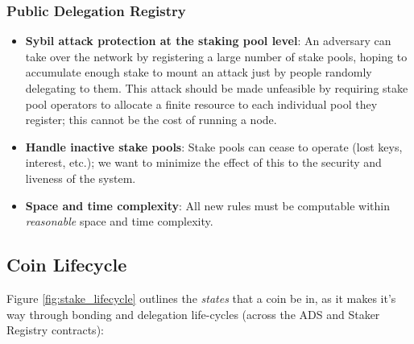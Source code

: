 \subsubsection{Public Delegation Registry}
\begin{itemize}
    \item \textbf{Sybil attack protection at the staking pool level}: An adversary can take over the network by registering a large number of stake pools, hoping to accumulate enough stake to mount an attack just by people randomly delegating to them. This attack should be made unfeasible by requiring stake pool operators to allocate a finite resource to each individual pool they register; this cannot be the cost of running a node.
    \item \textbf{Handle inactive stake pools}: Stake pools can cease to operate (lost keys, interest, etc.); we want to minimize the effect of this to the security and liveness of the system. 
    \item \textbf{Space and time complexity}: All new rules must be computable within \textit{reasonable} space and time complexity. 
\end{itemize}

\subsection{Coin Lifecycle} \label{stake_concerns}

Figure \ref{fig:stake_lifecycle} outlines the \textit{states} that a coin be in, as it makes it's way through bonding and delegation life-cycles (across the ADS and Staker Registry contracts): 

